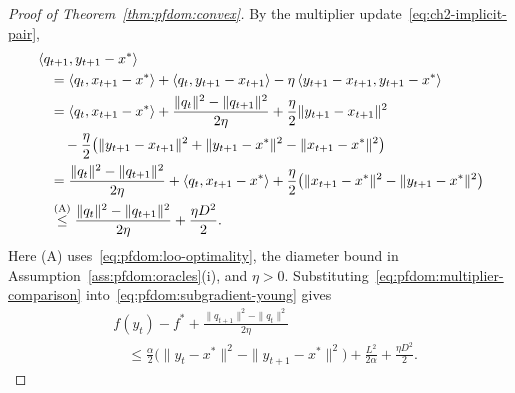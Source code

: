 \begin{proof}[Proof of Theorem~\ref{thm:pfdom:convex}]
By the multiplier update~\eqref{eq:ch2-implicit-pair},
\begin{equation}\label{eq:pfdom:multiplier-comparison}
\begin{aligned}
 &\left\langle q_{t+1},y_{t+1}-x^* \right\rangle\\
 &\quad=\left\langle q_t,x_{t+1}-x^* \right\rangle
   +\left\langle q_t,y_{t+1}-x_{t+1} \right\rangle
   -\eta\left\langle y_{t+1}-x_{t+1},y_{t+1}-x^* \right\rangle\\
 &\quad=\left\langle q_t,x_{t+1}-x^* \right\rangle
   +\frac{\|q_t\|^2-\|q_{t+1}\|^2}{2\eta}
   +\frac\eta2\|y_{t+1}-x_{t+1}\|^2\\
 &\qquad-\frac\eta2\bigl(\|y_{t+1}-x_{t+1}\|^2
                +\|y_{t+1}-x^*\|^2-\|x_{t+1}-x^*\|^2\bigr)\\
 &\quad=\frac{\|q_t\|^2-\|q_{t+1}\|^2}{2\eta}
   +\left\langle q_t,x_{t+1}-x^* \right\rangle
   +\frac\eta2\bigl(\|x_{t+1}-x^*\|^2-\|y_{t+1}-x^*\|^2\bigr)\\
 &\quad\overset{\mathrm{(A)}}{\le}
   \frac{\|q_t\|^2-\|q_{t+1}\|^2}{2\eta}+\frac{\eta D^2}{2}.
\end{aligned}
\end{equation}
Here (A) uses~\eqref{eq:pfdom:loo-optimality}, the diameter bound in
Assumption~\ref{ass:pfdom:oracles}(i), and $\eta>0$.
Substituting~\eqref{eq:pfdom:multiplier-comparison}
into~\eqref{eq:pfdom:subgradient-young} gives
\begin{equation}\label{eq:pfdom:one-step}
\begin{aligned}
 &f(y_t)-f^*+\frac{\|q_{t+1}\|^2-\|q_t\|^2}{2\eta}\\
 &\quad\le\frac\alpha2\bigl(\|y_t-x^*\|^2-\|y_{t+1}-x^*\|^2\bigr)
   +\frac{L^2}{2\alpha}+\frac{\eta D^2}{2}.
\end{aligned}
\end{equation}


\end{proof}
